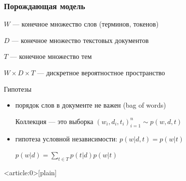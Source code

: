 \documentclass[fullscreen=true, bookmarks=true, hyperref={pdfencoding=unicode}]{beamer}
\begin{document}
\begin{frame}
  \frametitle{Порождающая модель}

  $W$ — конечное множество слов (терминов, токенов)

  $D$ — конечное множество текстовых документов

  $T$ — конечное множество тем

  $W \times D \times T$ — дискретное вероятностное пространство

  \pause
  \vspace{1cm}
  \begin{block}{Гипотезы}
    \begin{itemize}
      \item порядок слов в документе не важен (bag of words)

            Коллекция — это выборка $(w_i, d_i, t_i)_{i=1}^n \sim p(w, d, t)$

      \item гипотеза условной независимости: $p(w|d, t) = p(w|t)$

            $ p(w|d) = \sum\limits_{t\in T}p(t|d)p(w|t)$
    \end{itemize}
  \end{block}
\end{frame}


{ %
    \begin{frame}<article:0>[plain]
     \end{frame}
}
\end{document}
